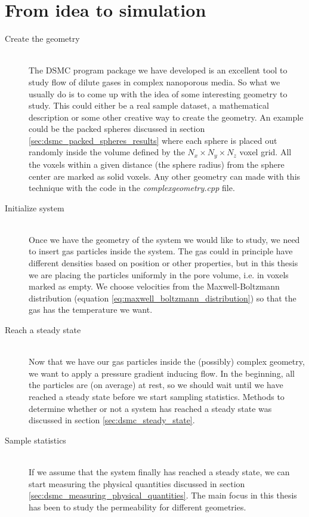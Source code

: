 \section{From idea to simulation}
\begin{description}
  \item[Create the geometry] \hfill \\
The DSMC program package we have developed is an excellent tool to study flow of dilute gases in complex nanoporous media. So what we usually do is to come up with the idea of some interesting geometry to study. This could either be a real sample dataset, a mathematical description or some other creative way to create the geometry. An example could be the packed spheres discussed in section \ref{sec:dsmc_packed_spheres_results} where each sphere is placed out randomly inside the volume defined by the $N_x\times N_y \times N_z$ voxel grid. All the voxels within a given distance (the sphere radius) from the sphere center are marked as solid voxels. Any other geometry can made with this technique with the code in the \textit{complexgeometry.cpp} file. 
\item[Initialize system] \hfill \\
Once we have the geometry of the system we would like to study, we need to insert gas particles inside the system. The gas could in principle have different densities based on position or other properties, but in this thesis we are placing the particles uniformly in the pore volume, i.e. in voxels marked as empty. We choose velocities from the Maxwell-Boltzmann distribution (equation \eqref{eq:maxwell_boltzmann_distribution}) so that the gas has the temperature we want.
\item[Reach a steady state] \hfill \\
Now that we have our gas particles inside the (possibly) complex geometry, we want to apply a pressure gradient inducing flow. In the beginning, all the particles are (on average) at rest, so we should wait until we have reached a steady state before we start sampling statistics. Methods to determine whether or not a system has reached a steady state was discussed in section \ref{sec:dsmc_steady_state}. 
\item[Sample statistics] \hfill \\
If we assume that the system finally has reached a steady state, we can start measuring the physical quantities discussed in section \ref{sec:dsmc_measuring_physical_quantities}. The main focus in this thesis has been to study the permeability for different geometries. 
\end{description}


